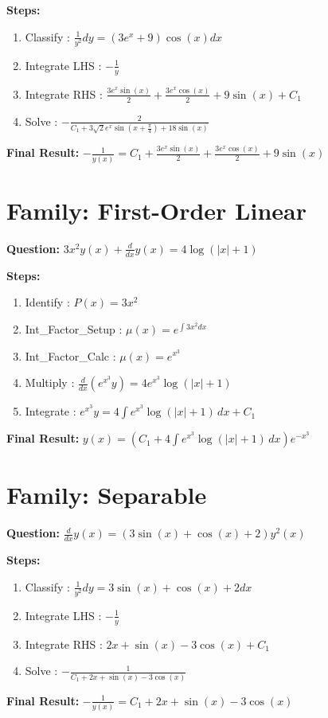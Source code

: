 \documentclass{article}
\begin{document}
\textbf{Steps:}
\begin{enumerate}
\item Classify :  $\frac{1}{y^{2}} dy = \left(3 e^{x} + 9\right) \cos{\left(x \right)} dx$
\item Integrate LHS :  $- \frac{1}{y}$
\item Integrate RHS :  $\frac{3 e^{x} \sin{\left(x \right)}}{2} + \frac{3 e^{x} \cos{\left(x \right)}}{2} + 9 \sin{\left(x \right)} + C_1$
\item Solve :  $- \frac{2}{C_{1} + 3 \sqrt{2} e^{x} \sin{\left(x + \frac{\pi}{4} \right)} + 18 \sin{\left(x \right)}}$
\end{enumerate}
\textbf{Final Result:} $- \frac{1}{y{\left(x \right)}} = C_{1} + \frac{3 e^{x} \sin{\left(x \right)}}{2} + \frac{3 e^{x} \cos{\left(x \right)}}{2} + 9 \sin{\left(x \right)}$

\section*{Family: First-Order Linear}
\textbf{Question:} $3 x^{2} y{\left(x \right)} + \frac{d}{d x} y{\left(x \right)} = 4 \log{\left(\left|{x}\right| + 1 \right)}$

\textbf{Steps:}
\begin{enumerate}
\item Identify :  $P(x) = 3 x^{2}$
\item Int_Factor_Setup :  $\mu(x) = e^{\int 3 x^{2} dx}$
\item Int_Factor_Calc :  $\mu(x) = e^{x^{3}}$
\item Multiply :  $\frac{d}{dx}(e^{x^{3}}y) = 4 e^{x^{3}} \log{\left(\left|{x}\right| + 1 \right)}$
\item Integrate :  $e^{x^{3}}y = 4 \int e^{x^{3}} \log{\left(\left|{x}\right| + 1 \right)}\, dx + C_1$
\end{enumerate}
\textbf{Final Result:} $y{\left(x \right)} = \left(C_{1} + 4 \int e^{x^{3}} \log{\left(\left|{x}\right| + 1 \right)}\, dx\right) e^{- x^{3}}$

\section*{Family: Separable}
\textbf{Question:} $\frac{d}{d x} y{\left(x \right)} = \left(3 \sin{\left(x \right)} + \cos{\left(x \right)} + 2\right) y^{2}{\left(x \right)}$

\textbf{Steps:}
\begin{enumerate}
\item Classify :  $\frac{1}{y^{2}} dy = 3 \sin{\left(x \right)} + \cos{\left(x \right)} + 2 dx$
\item Integrate LHS :  $- \frac{1}{y}$
\item Integrate RHS :  $2 x + \sin{\left(x \right)} - 3 \cos{\left(x \right)} + C_1$
\item Solve :  $- \frac{1}{C_{1} + 2 x + \sin{\left(x \right)} - 3 \cos{\left(x \right)}}$
\end{enumerate}
\textbf{Final Result:} $- \frac{1}{y{\left(x \right)}} = C_{1} + 2 x + \sin{\left(x \right)} - 3 \cos{\left(x \right)}$
\end{document}
